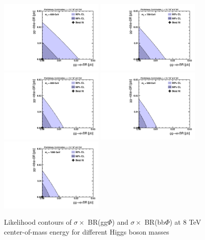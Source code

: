 \begin{figure}[!h]\begin{center}
 \includegraphics[width=0.45\textwidth]{MSSM/PLOTS/cmb-ggH-bbH-scan-GGH-BBH-600.pdf}
 \includegraphics[width=0.45\textwidth]{MSSM/PLOTS/cmb-ggH-bbH-scan-GGH-BBH-700.pdf}
 \includegraphics[width=0.45\textwidth]{MSSM/PLOTS/cmb-ggH-bbH-scan-GGH-BBH-800.pdf}
 \includegraphics[width=0.45\textwidth]{MSSM/PLOTS/cmb-ggH-bbH-scan-GGH-BBH-900.pdf}
 \includegraphics[width=0.45\textwidth]{MSSM/PLOTS/cmb-ggH-bbH-scan-GGH-BBH-1000.pdf}
 \caption{Likelihood contours of $\sigma\times$ BR(gg$\Phi$) and $\sigma\times$ BR(bb$\Phi$) at 8 TeV center-of-mass energy for different Higgs boson masses}
  \label{fig:contour4}\end{center}\end{figure}

